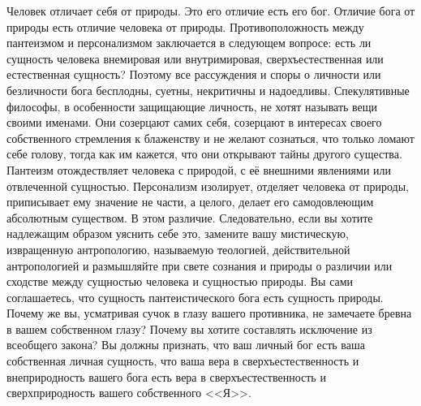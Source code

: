 \documentclass[12pt,oneside]{book}
\begin{document}
Человек отличает себя от природы. Это его отличие есть его бог. Отличие бога от природы есть отличие человека от природы. Противоположность между пантеизмом и персонализмом заключается в следующем вопросе: есть ли сущность человека внемировая или внутримировая, сверхъестественная или естественная сущность? Поэтому все рассуждения и споры о личности или безличности бога бесплодны, суетны, некритичны и надоедливы. Спекулятивные философы, в особенности защищающие личность, не хотят называть вещи своими именами. Они созерцают самих себя, созерцают в интересах своего собственного стремления к блаженству и не желают сознаться, что только ломают себе голову, тогда как им кажется, что они открывают тайны другого существа. Пантеизм отождествляет человека с природой, с её внешними явлениями или отвлеченной сущностью. Персонализм изолирует, отделяет человека от природы, приписывает ему значение не части, а целого, делает его самодовлеющим абсолютным существом. В этом различие. Следовательно, если вы хотите надлежащим образом уяснить себе это, замените вашу мистическую, извращенную антропологию, называемую теологией, действительной антропологией и размышляйте при свете сознания и природы о различии или сходстве между сущностью человека и сущностью природы. Вы сами соглашаетесь, что сущность пантеистического бога есть сущность природы. Почему же вы, усматривая сучок в глазу вашего противника, не замечаете бревна в вашем собственном глазу? Почему вы хотите составлять исключение из всеобщего закона? Вы должны признать, что ваш личный бог есть ваша собственная личная сущность, что ваша вера в сверхъестественность и внеприродность вашего бога есть вера в сверхъестественность и сверхприродность вашего собственного <<Я>>.
\end{document}
